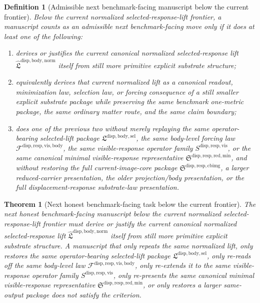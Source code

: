\documentclass[11pt]{article}
\newcommand{\LiftSelectionPackage}{\mathfrak L^{\mathrm{disp,body,sel}}}
\newcommand{\NormalizedLiftPackage}{\widehat{\mathfrak L}^{\mathrm{disp,body,norm}}}
\newcommand{\VisibleBodyForcingLaw}{\mathscr F^{\mathrm{disp,resp,vis,body}}}
\newcommand{\VisibleResponseOperator}{S^{\mathrm{disp,resp,vis}}}
\newcommand{\MinimalReducedStructure}{\mathfrak S^{\mathrm{disp,resp,red,min}}}
\newcommand{\CurrentBodyImageCore}{\mathfrak S^{\mathrm{disp,resp,cbimg}}}
\newtheorem{definition}{Definition}
\newtheorem{theorem}{Theorem}
\begin{document}
\begin{definition}[Admissible next benchmark-facing manuscript below the current frontier]
Below the current normalized selected-response-lift frontier, a manuscript counts as an admissible next benchmark-facing move only if it does at least one of the following:
\begin{enumerate}
    \item derives or justifies the current canonical normalized selected-response lift \(\NormalizedLiftPackage\) itself from still more primitive explicit substrate structure;
    \item equivalently derives that current normalized lift as a canonical readout, minimization law, selection law, or forcing consequence of a still smaller explicit substrate package while preserving the same benchmark one-metric package, the same ordinary matter route, and the same claim boundary;
    \item does one of the previous two without merely replaying the same operator-bearing selected-lift package \(\LiftSelectionPackage\), the same body-level forcing law \(\VisibleBodyForcingLaw\), the same visible-response operator family \(\VisibleResponseOperator\), or the same canonical minimal visible-response representative \(\MinimalReducedStructure\), and without restoring the full current-image-core package \(\CurrentBodyImageCore\), a larger reduced-carrier presentation, the older projection/body presentation, or the full displacement-response substrate-law presentation.
\end{enumerate}
\end{definition}

\begin{theorem}[Next honest benchmark-facing task below the current frontier]
The next honest benchmark-facing manuscript below the current normalized selected-response-lift frontier must derive or justify the current canonical normalized selected-response lift \(\NormalizedLiftPackage\) itself from still more primitive explicit substrate structure. A manuscript that only repeats the same normalized lift, only restores the same operator-bearing selected-lift package \(\LiftSelectionPackage\), only re-reads off the same body-level law \(\VisibleBodyForcingLaw\), only re-extends it to the same visible-response operator family \(\VisibleResponseOperator\), only re-presents the same canonical minimal visible-response representative \(\MinimalReducedStructure\), or only restores a larger same-output package does not satisfy the criterion.
\end{theorem}
\end{document}
